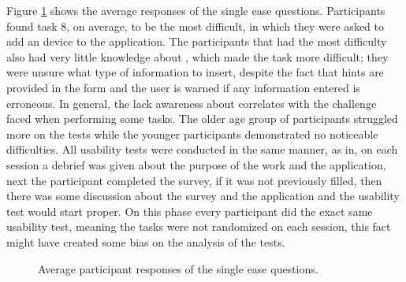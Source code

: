 Figure \ref{fig:single_ease_questions} shows the average responses of the
single ease questions. Participants found task 8, on average, to be the most difficult,
in which they were asked to add an \hyperlink{\acronym}{\acronym} device to the application. The
participants that had the most difficulty also had very little knowledge
about \hyperlink{\acronym}{\acronym}, which made the task more difficult; they were unsure what type
of information to insert, despite the fact that hints are provided in the
form and the user is warned if any information entered is erroneous. In
general, the lack awareness about \hyperlink{\acronym}{\acronym} correlates with the challenge faced when
performing some tasks. The older age group of participants struggled more on the
tests while the younger participants demonstrated no noticeable difficulties.
All usability tests were conducted in the same manner, as in, on each session
a debrief was given about the purpose of the work and the application, next
the participant completed the survey, if it was not previously filled, then there
was some discussion about the survey and the application and the usability
test would start proper. On this phase every participant did the exact same
usability test, meaning the tasks were not randomized on each session, this
fact might have created some bias on the analysis of the tests.

\begin{figure}[H]
    \begin{center}
        \caption{Average participant responses of the single ease questions.}
        \label{fig:single_ease_questions}
    \end{center}
\end{figure}

